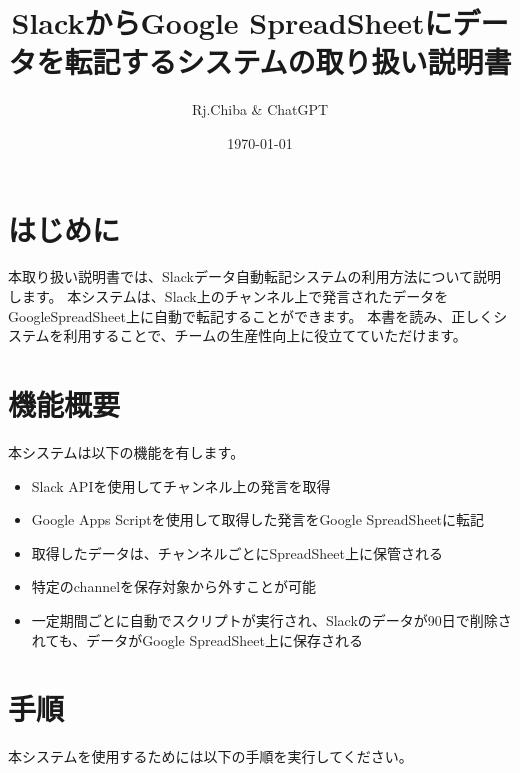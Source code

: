 \documentclass[a4j, 11pt]{jsarticle}
\begin{document}
\title{SlackからGoogle SpreadSheetにデータを転記するシステムの取り扱い説明書}
\author{ Rj.Chiba \& ChatGPT }
\date{\today}
\maketitle

\section{はじめに}
本取り扱い説明書では、Slackデータ自動転記システムの利用方法について説明します。
本システムは、Slack上のチャンネル上で発言されたデータをGoogleSpreadSheet上に自動で転記することができます。
本書を読み、正しくシステムを利用することで、チームの生産性向上に役立てていただけます。

\section{機能概要}
本システムは以下の機能を有します。

\begin{itemize}
\item Slack APIを使用してチャンネル上の発言を取得
\item Google Apps Scriptを使用して取得した発言をGoogle SpreadSheetに転記
\item 取得したデータは、チャンネルごとにSpreadSheet上に保管される
\item 特定のchannelを保存対象から外すことが可能
\item 一定期間ごとに自動でスクリプトが実行され、Slackのデータが90日で削除されても、データがGoogle SpreadSheet上に保存される
\end{itemize}

\section{手順}
本システムを使用するためには以下の手順を実行してください。
\end{document}
